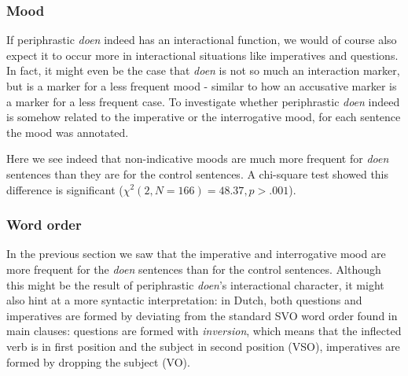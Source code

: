 \documentclass[12pt]{article}
\begin{document}
\subsubsection{Mood}

If periphrastic \emph{doen} indeed has an interactional function, we would of course also expect it to occur more in interactional situations like imperatives and questions. In fact, it might even be the case that \emph{doen} is not so much an interaction marker, but is a marker for a less frequent mood - similar to how an accusative marker is a marker for a less frequent case. To investigate whether periphrastic \emph{doen} indeed is somehow related to the imperative or the interrogative mood, for each sentence the mood was annotated.

\begin{table}[h] \footnotesize

\caption{\footnotesize Distribution of mood for the \emph{doen} sentences and the control sentences.}
\end{table}

Here we see indeed that non-indicative moods are much more frequent for \emph{doen} sentences than they are for the control sentences. A chi-square test showed this difference is significant ($\chi^2(2, N=166) = 48.37, p > .001$).

\subsubsection{Word order}

In the previous section we saw that the imperative and interrogative mood are more frequent for the \emph{doen} sentences than for the control sentences. Although this might be the result of periphrastic \emph{doen}'s interactional character, it might also hint at a more syntactic interpretation: in Dutch, both questions and imperatives are formed by deviating from the standard SVO word order found in main clauses: questions are formed with \emph{inversion}, which means that the inflected verb is in first position and the subject in second position (VSO), imperatives are formed by dropping the subject (VO).
\end{document}
